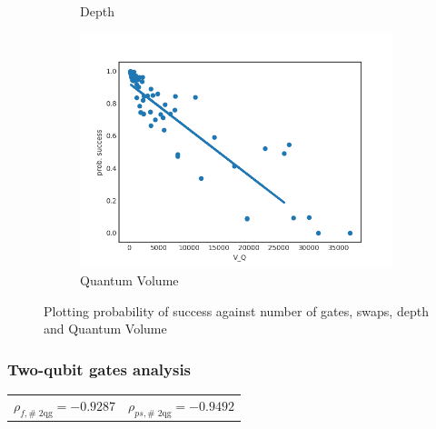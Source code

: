 \documentclass[11pt]{article}
\begin{document}
\begin{figure}[H]
\begin{subfigure}[b]{0.5\linewidth}
    \caption{Depth} 
    \label{fig:ps_d_3000_0} 
  \end{subfigure}%
  \begin{subfigure}[b]{0.5\linewidth}
    \centering
    \includegraphics[width=0.75\linewidth]{ps_q_3000_0} 
    \caption{Quantum Volume} 
    \label{fig:ps_q_3000_0} 
  \end{subfigure} 
  \caption{Plotting probability of success against number of gates, swaps, depth and Quantum Volume}
  \label{fig:ps_3000_0} 
\end{figure}

\subsubsection{Two-qubit gates analysis}
\label{sec:orgcc599b2}

\begin{center}
\begin{tabular}{ll}
\(\rho _{f,\text{# 2qg}} = -0.9287\) & \(\rho _{ps,\text{# 2qg}} = -0.9492\)\\
\end{tabular}
\end{center}
\end{document}
